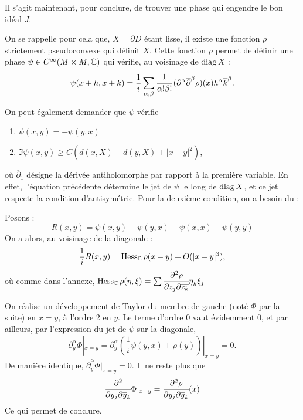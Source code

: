 Il s'agit maintenant, pour conclure, de trouver une phase qui engendre le bon idéal $J$.

On se rappelle pour cela que, $X=\partial D$ étant lisse, il existe une fonction $\rho$ strictement pseudoconvexe qui définit $X$. Cette fonction $\rho$ permet de définir une phase $\psi \in C^{\infty}(M \times M,\mathbb{C})$ qui vérifie, au voisinage de $\operatorname{diag} X$ :
\begin{equation*}
	\psi(x+h,x+k) = \frac1i \sum_{\alpha,\beta}\cfrac{1}{\alpha !\beta!}\,(\partial^{\alpha}\overline{\partial}^{\beta}\rho)(x)h^{\alpha}\overline{k}^{\beta}.
\end{equation*}

On peut également demander que $\psi$ vérifie 
\begin{enumerate}
	\item $\psi(x,y)=-\overline{\psi(y,x)}$
	\item $\Im \psi(x,y) \geq C(d(x,X)+d(y,X) + |x-y|^2)$,
\end{enumerate}
où $\overline{\partial}_1$ désigne la dérivée antiholomorphe par rapport à la première variable. En effet, l'équation précédente détermine le jet de $\psi$ le long de $\operatorname{diag} X$, et ce jet respecte la condition d'antisymétrie. Pour la deuxième condition, on a besoin du :
\begin{lem} Posons :
	\begin{equation*}
		R(x,y)=\psi(x,y) + \psi(y,x)-\psi(x,x)-\psi(y,y)
	\end{equation*}
	On a alors, au voisinage de la diagonale :
	\begin{equation*}
	\frac{1}{i}R(x,y)= \operatorname{Hess}_{\mathbb{C}}\rho(x-y) + O(|x-y|^3),
	\end{equation*}
	où comme dans l'annexe, $\operatorname{Hess}_{\mathbb{C}}\rho(\eta,\xi)=\sum \cfrac{\partial^2\rho}{\partial z_j \partial \overline{z_k}}\overline{\eta}_k\xi_j$
\end{lem}
\begin{preuve}
	On réalise un développement de Taylor du membre de gauche (noté $\Phi$ par la suite) en $x=y$, à l'ordre 2 en $y$. Le terme d'ordre 0 vaut évidemment $0$, et par ailleurs, par l'expression du jet de $\psi$ sur la diagonale,
	\begin{equation*}
		\partial^{\alpha}_y\Phi|_{x=y} = \partial^{\alpha}_y(\frac{1}{i}\psi(y,x) + \rho(y))|_{x=y}=0.
	\end{equation*}
	De manière identique, $\overline{\partial}^{\alpha}_y\Phi|_{x=y}=0$. Il ne reste plus que
	\begin{equation*}
		\cfrac{\partial^2 }{\partial y_j\partial \overline{y}_k}\Phi|_{x=y} = \cfrac{\partial^2 \rho}{\partial y_j\partial \overline{y}_k}(x)
	\end{equation*}
	Ce qui permet de conclure.
\end{preuve}
